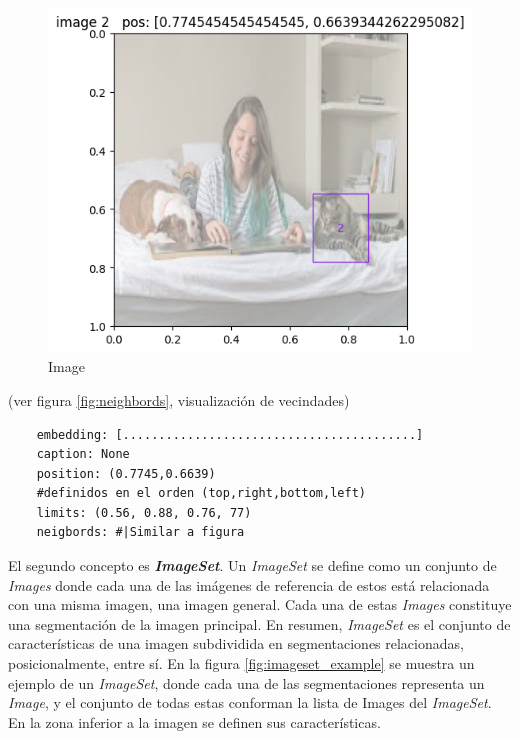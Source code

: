 \begin{figure}[H]
    \centering
    \includegraphics[height=0.3\textheight]{Graphics/ImageExample.png}
    \caption{Image}
    \label{fig:imageexample}
\end{figure}

(ver figura \ref{fig:neighbords}, visualizaci\'on de vecindades)
\begin{verbatim}
    embedding: [.........................................]    
    caption: None    
    position: (0.7745,0.6639)
    #definidos en el orden (top,right,bottom,left)
    limits: (0.56, 0.88, 0.76, 77)
    neigbords: #|Similar a figura
\end{verbatim}


El segundo concepto es \textbf{\textit{ImageSet}}. Un \textit{ImageSet} se define como un conjunto de \textit{Images} donde cada una de las imágenes de referencia de estos está relacionada con una misma imagen, una imagen general. Cada una de estas \textit{Images} constituye una segmentación de la imagen principal. En resumen, \textit{ImageSet} es el conjunto de características de una imagen subdividida en segmentaciones relacionadas, posicionalmente, entre s\'i. En la figura \ref{fig:imageset_example} se muestra un ejemplo de un \textit{ImageSet}, donde cada una de las segmentaciones representa un \textit{Image}, y el conjunto de todas estas conforman la lista de Images del \textit{ImageSet}. En la zona inferior a la imagen se definen sus caracter\'isticas.

